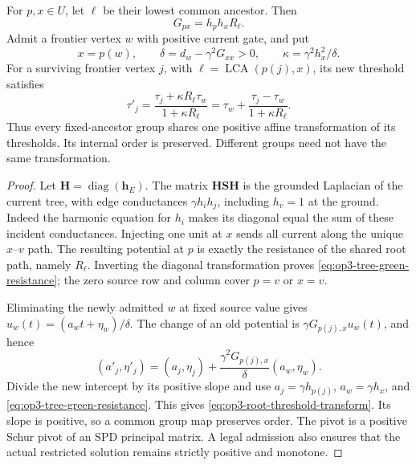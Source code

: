 \begin{lemma}
\label{lem:op3-root-resistance-transform}
For $p,x\in U$, let $\ell$ be their lowest common ancestor. Then
\begin{equation}
 G_{px}=h_ph_xR_\ell.
 \label{eq:op3-tree-green-resistance}
\end{equation}
Admit a frontier vertex $w$ with positive current gate, and put
\[
 x=p(w),\qquad
 \delta=d_w-\gamma^2G_{xx}>0,\qquad
 \kappa=\gamma^2h_x^2/\delta.
\]
For a surviving frontier vertex $j$, with
$\ell=\operatorname{LCA}(p(j),x)$, its new threshold satisfies
\begin{equation}
 \tau'_j=\frac{\tau_j+\kappa R_\ell\tau_w}
                    {1+\kappa R_\ell}
 =\tau_w+\frac{\tau_j-\tau_w}{1+\kappa R_\ell}.
 \label{eq:op3-root-threshold-transform}
\end{equation}
Thus every fixed-ancestor group shares one positive affine transformation
of its thresholds. Its internal order is preserved. Different groups need
not have the same transformation.
\end{lemma}
\begin{proof}
Let $\bm H=\operatorname{diag}(\bm h_E)$. The matrix
$\bm H\bm S\bm H$ is the grounded Laplacian of the current tree, with
edge conductances $\gamma h_ih_j$, including $h_v=1$ at the ground.
Indeed the harmonic equation for $h_i$ makes its diagonal equal the sum
of these incident conductances. Injecting one unit at $x$ sends all current
along the unique $x$--$v$ path. The resulting potential at $p$ is exactly
the resistance of the shared root path, namely $R_\ell$. Inverting the
diagonal transformation proves \cref{eq:op3-tree-green-resistance}; the
zero source row and column cover $p=v$ or $x=v$.

Eliminating the newly admitted $w$ at fixed source value gives
$u_w(t)=(a_wt+\eta_w)/\delta$. The change of an old potential is
$\gamma G_{p(j),x}u_w(t)$, and hence
\[
 (a'_j,\eta'_j)=(a_j,\eta_j)
       +\frac{\gamma^2G_{p(j),x}}\delta(a_w,\eta_w).
\]
Divide the new intercept by its positive slope and use
$a_j=\gamma h_{p(j)}$, $a_w=\gamma h_x$, and
\cref{eq:op3-tree-green-resistance}. This gives
\cref{eq:op3-root-threshold-transform}. Its slope is positive, so a
common group map preserves order. The pivot is a positive Schur pivot of
an SPD principal matrix. A legal admission also ensures that the actual
restricted solution remains strictly positive and monotone.
\end{proof}

